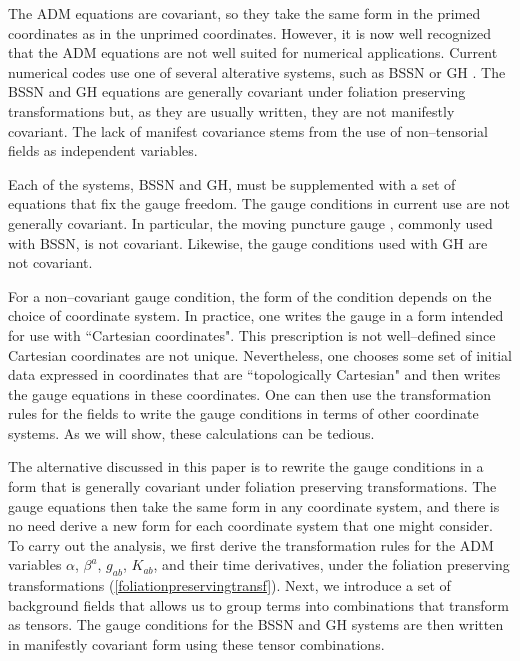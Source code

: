 \documentclass[letterpaper,nofootinbib,prd,amsmath,onecolumn]{revtex4-1}
\begin{document}
The ADM equations are covariant, so they take the same form in the primed coordinates as in the unprimed coordinates. However, it is now 
well recognized that the ADM equations 
are not well suited for numerical applications. Current numerical codes use one of several alterative systems, such as 
BSSN  \cite{Shibata:1995we,Baumgarte:1998te} or  GH \cite{Friedrich:1985,Garfinkle:2001ni}.
The BSSN and GH equations are generally covariant under foliation preserving transformations but, as they are usually written, 
they are not manifestly covariant. The lack of manifest covariance stems from the use of non--tensorial fields as independent variables. 

Each of the systems, BSSN and GH, must be supplemented with a set of equations that fix the gauge freedom. 
The gauge conditions in current use are not generally covariant. In particular, the moving puncture gauge \cite{Bona:1994dr,Alcubierre:2002kk}, commonly 
used with BSSN, is not covariant.  Likewise, the gauge conditions \cite{Pretorius:2006tp,Szilagyi:2009qz} used 
with GH are not covariant.  

For a non--covariant gauge condition, the form of the condition depends on the choice of coordinate system. 
In practice, one writes the gauge  in a form intended for use with ``Cartesian coordinates". This prescription is not  well--defined 
since Cartesian coordinates are not unique. Nevertheless, one chooses some set of initial data expressed in coordinates that are ``topologically Cartesian"  
and then writes the gauge equations in these coordinates.  One can then use the transformation rules for the fields to write the gauge conditions in terms of 
other coordinate systems. As we will show, these calculations can be tedious. 

The alternative discussed in this paper is to rewrite the gauge conditions in a form that is generally covariant under foliation preserving 
transformations. The gauge equations then take the same form in any coordinate system, and there is no need derive a new form 
for each coordinate system that one might consider. To carry out the analysis, we first derive the transformation rules for the ADM variables $\alpha$, $\beta^a$, 
$g_{ab}$, $K_{ab}$, and their time derivatives, under the foliation preserving transformations (\ref{foliationpreservingtransf}). Next, we introduce a 
set of background fields that allows us to group terms into combinations that transform as tensors. The gauge conditions for the BSSN and GH systems are 
then written in manifestly covariant form using these tensor combinations. 
\end{document}
